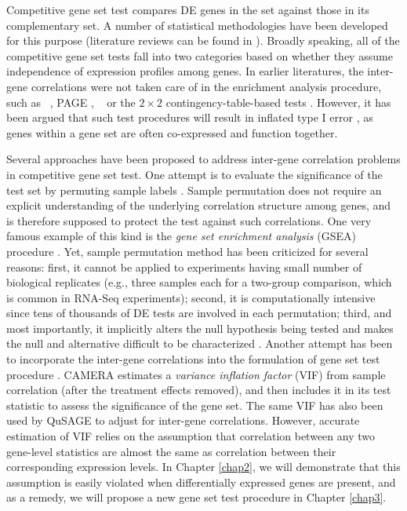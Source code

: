 Competitive gene set test compares DE genes in the set against those in its complementary set. A
number of
statistical methodologies have been developed for this purpose (literature reviews can be found in
\cite{huang2009bioinformatics,khatri2012ten, mishra2014gene}). Broadly speaking, all of the
competitive gene set tests fall into two categories based on whether they assume independence of
expression profiles among genes. In earlier literatures, the inter-gene correlations were not taken
care of in the enrichment analysis procedure, such as \gent~\citep{tian2005discovering}, PAGE
\citep{kim2005page}, \genr~\citep{michaud2008integrative} or the $2\times 2$ contingency-table-based
tests \cite{alexa2010topgo, huang2007david,ye2006wego}. However, it has been argued that such test
procedures will result in inflated type I error 
\citep{efron2007testing,gatti2010heading,goeman2007analyzing,wu2012camera,yaari2013quantitative}, 
as genes within a gene set are often
co-expressed and function together.

Several approaches have been proposed to address inter-gene correlation problems in competitive gene
set test. One attempt is to evaluate the significance of the test set by permuting sample labels
\citep{efron2007testing,gatti2010heading,subramanian2005gene}. Sample permutation does not require
an explicit understanding of the underlying correlation structure among genes, and is therefore
supposed to protect the test against such correlations. One very famous example of this kind is the
\textit{gene set enrichment analysis} (GSEA) procedure \citep{subramanian2005gene}. Yet, sample
permutation method has been criticized for several reasons: first, it cannot be applied to
experiments having small
number of biological replicates (e.g., three samples each for a two-group comparison, which is 
common in RNA-Seq experiments);
second, it is computationally intensive since tens of thousands of DE tests are involved in each 
permutation; 
third, and most importantly, it implicitly alters the null hypothesis being tested and makes the 
null and
alternative difficult to be characterized \citep{goeman2007analyzing, khatri2012ten, wu2012camera}.
Another attempt has been to incorporate the inter-gene correlations into the formulation of gene set
test procedure \citep{wu2012camera,yaari2013quantitative}. CAMERA \citep{wu2012camera} estimates a
\textit{variance
	inflation factor} (VIF) from sample correlation (after the treatment effects removed), and then
includes it in its test statistic to assess the significance of the gene set. The same VIF has also 
been used by QuSAGE
\cite{yaari2013quantitative} 
to adjust for inter-gene correlations. However, accurate estimation of VIF relies on
the assumption that correlation between any two gene-level statistics are almost the same as
correlation between their corresponding expression levels. In Chapter \ref{chap2}, we will
demonstrate that this assumption is easily violated when differentially expressed genes are present,
and as a remedy, we will propose a new gene set test procedure in Chapter \ref{chap3}.  






